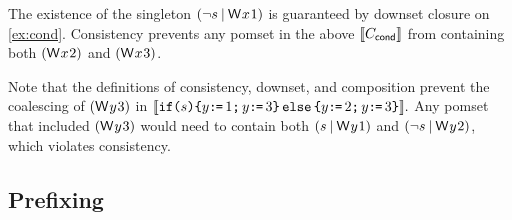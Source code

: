 The existence of the singleton $(\lnot s \mathbin{\mid}\DW{x}{1})$ is
guaranteed by downset closure on \eqref{ex:cond}.  Consistency prevents any
pomset in the above $\llbracket C_{\mathsf{cond}}\rrbracket$ from containing both
$(\DW{x}{2})$ and $(\DW{x}{3})$.

Note that the definitions of consistency, downset, and composition prevent
the coalescing of $(\DW{y}{3})$ in
\begin{math}
  \llbracket\texttt{if}\allowbreak\texttt{(}s\texttt{)}\allowbreak\texttt{\{} y\texttt{:}\mkern-1mu\texttt{=}\, 1 \texttt{;}\,\allowbreak y\texttt{:}\mkern-1mu\texttt{=}\, 3 \texttt{\}}\,\allowbreak\texttt{else}\allowbreak\,\texttt{\{} y\texttt{:}\mkern-1mu\texttt{=}\, 2 \texttt{;}\,\allowbreak y\texttt{:}\mkern-1mu\texttt{=}\, 3 \texttt{\}}\rrbracket.
\end{math}
Any pomset that included $(\DW{y}{3})$ would need to contain both $(s
\mathbin{\mid}\DW{y}{1})$ and $(\lnot s \mathbin{\mid}\DW{y}{2})$, which
violates consistency.



\subsection{Prefixing} %
\label{sec:pop}

